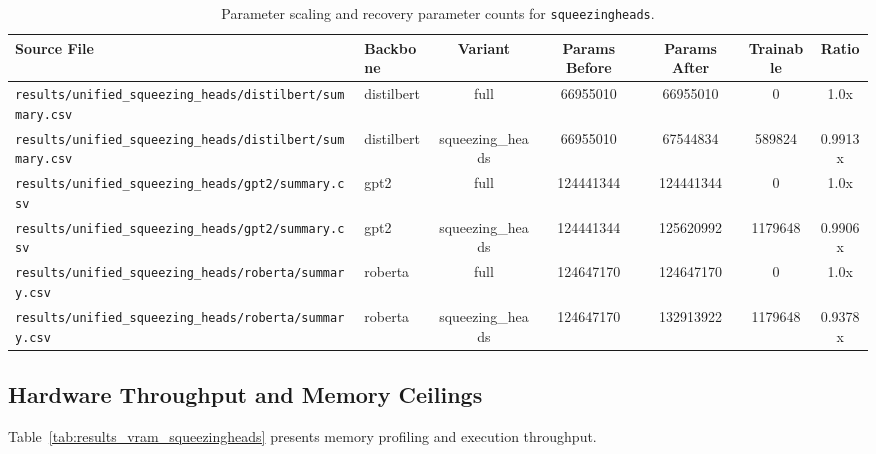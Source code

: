 \begin{table}[t]
\centering
\small
\begin{tabular}{llccccc}
\toprule
\textbf{Source File} & \textbf{Backbone} & \textbf{Variant} & \textbf{Params Before} & \textbf{Params After} & \textbf{Trainable} & \textbf{Ratio} \\
\midrule
\texttt{results/unified\_squeezing\_heads/distilbert/summary.csv} & distilbert & full & 66955010 & 66955010 & 0 & 1.0x \\
\texttt{results/unified\_squeezing\_heads/distilbert/summary.csv} & distilbert & squeezing\_heads & 66955010 & 67544834 & 589824 & 0.9913x \\
\texttt{results/unified\_squeezing\_heads/gpt2/summary.csv} & gpt2 & full & 124441344 & 124441344 & 0 & 1.0x \\
\texttt{results/unified\_squeezing\_heads/gpt2/summary.csv} & gpt2 & squeezing\_heads & 124441344 & 125620992 & 1179648 & 0.9906x \\
\texttt{results/unified\_squeezing\_heads/roberta/summary.csv} & roberta & full & 124647170 & 124647170 & 0 & 1.0x \\
\texttt{results/unified\_squeezing\_heads/roberta/summary.csv} & roberta & squeezing\_heads & 124647170 & 132913922 & 1179648 & 0.9378x \\
\bottomrule
\end{tabular}
\caption{Parameter scaling and recovery parameter counts for \texttt{squeezingheads}.}
\label{tab:results_params_squeezingheads}
\end{table}

\subsection{Hardware Throughput and Memory Ceilings}
Table~\ref{tab:results_vram_squeezingheads} presents memory profiling and execution throughput.

